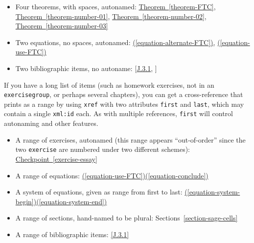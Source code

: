 \documentclass[pdflatex]{sn-jnl}
\theoremstyle{thmstyleone}%
\theoremstyle{thmstyletwo}%
\theoremstyle{thmstylethree}%
\newcommand{\xreffont}{\relax}
\newcommand{\mono}[1]{\texttt{#1}}
\numberwithin{equation}{section}
\begin{document}
\begin{itemize}[label=\textbullet]
\item{}Four theorems, with spaces, autonamed: \hyperref[theorem-FTC]{Theorem~{\xreffont\ref{theorem-FTC}}}, \hyperref[theorem-number-01]{Theorem~{\xreffont\ref{theorem-number-01}}}, \hyperref[theorem-number-02]{Theorem~{\xreffont\ref{theorem-number-02}}}, \hyperref[theorem-number-03]{Theorem~{\xreffont\ref{theorem-number-03}}}%
\item{}Two equations, no spaces, autonamed: \hyperref[equation-alternate-FTC]{({\xreffont\ref{equation-alternate-FTC}})}, \hyperref[equation-use-FTC]{({\xreffont\ref{equation-use-FTC}})}%
\item{}Two bibliographic items, no autoname: [\hyperlink{biblio-judson-AATA}{{\xreffont J.3.1}}, \hyperlink{biblio-lay-article}{{\xreffont 2}}]%
\end{itemize}
%
\par
If you have a long list of items (such as homework exercises, not in an \mono{exercisegroup}, or perhaps several chapters), you can get a cross-reference that prints as a range by using \mono{xref} with two attributes \mono{first} and \mono{last}, which may contain a single \mono{xml:id} each.  As with multiple references, \mono{first} will control autonaming and other features.%
\begin{itemize}[label=\textbullet]
\item{}A range of exercises, autonamed (this range appears ``out-of-order'' since the two \mono{exercise} are numbered under two different schemes): \hyperref[exercise-essay]{Checkpoint~{\xreffont\ref{exercise-essay}}\textendash{}{\xreffont 4.2.3.1}}%
\item{}A range of equations: \hyperref[equation-use-FTC]{({\xreffont\ref{equation-use-FTC}})\textendash{}({\xreffont\ref{equation-conclude}})}%
\item{}A system of equations, given as range from first to last: \hyperref[equation-system-begin]{({\xreffont\ref{equation-system-begin}})\textendash{}({\xreffont\ref{equation-system-end}})}%
\item{}A range of sections, hand-named to be plural: Sections~\hyperref[section-sage-cells]{{\xreffont\ref{section-sage-cells}}\textendash{}{\xreffont\ref{section-cross-referencing}}}%
\item{}A range of bibliographic items: \hyperlink{biblio-judson-AATA}{[{\xreffont J.3.1}\textendash{}{\xreffont 2}]}%
\end{itemize}
%
\par
\end{document}
